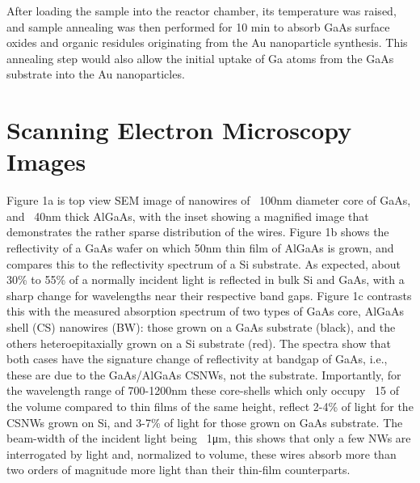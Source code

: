 After loading the sample into the reactor chamber, its temperature was raised,
and sample annealing was then performed for 10 min to absorb GaAs surface
oxides and organic residules originating from the Au nanoparticle synthesis.
This annealing step would also allow the initial uptake of Ga atoms from the
GaAs substrate into the Au nanoparticles. 

\section{Scanning Electron Microscopy Images} 

Figure 1a is top view SEM image of nanowires of ~100nm diameter core of GaAs,
and ~40nm thick AlGaAs, with the inset showing a magnified image that
demonstrates the rather sparse distribution of the wires. Figure 1b shows the
reflectivity of a GaAs wafer on which 50nm thin film of AlGaAs is grown, and
compares this to the reflectivity spectrum of a Si substrate. As expected,
about 30\% to 55\% of a normally incident light is reflected in bulk Si and GaAs,
with a sharp change for wavelengths near their respective band gaps. Figure 1c
contrasts this with the measured absorption spectrum of two types of GaAs core,
AlGaAs shell (CS) nanowires (BW): those grown on a GaAs substrate (black), and
the others heteroepitaxially grown on a Si substrate (red). The spectra show
that both cases have the signature change of reflectivity at bandgap of GaAs,
i.e., these are due to the GaAs/AlGaAs CSNWs, not the substrate. Importantly,
for the wavelength range of 700-1200nm these core-shells which only occupy ~15%
of the volume compared to thin films of the same height, reflect 2-4\% of light
for the CSNWs grown on Si, and 3-7\% of light for those grown on GaAs substrate.
The beam-width of the incident light being ~1μm, this shows that only a few NWs
are interrogated by light and, normalized to volume, these wires absorb more
than two orders of magnitude more light than their thin-film counterparts.

